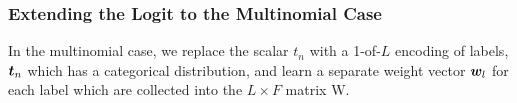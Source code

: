 %
%
%
%
%
%
%


\subsubsection*{Extending the Logit to the Multinomial Case}
In the multinomial case, we replace the scalar $t_n$ with a 1-of-$L$ encoding of labels, $\bm t_n$ which has a categorical distribution, and learn a separate weight vector $\bm w_l$ for each label which are collected into the $L \times F$ matrix W. 

